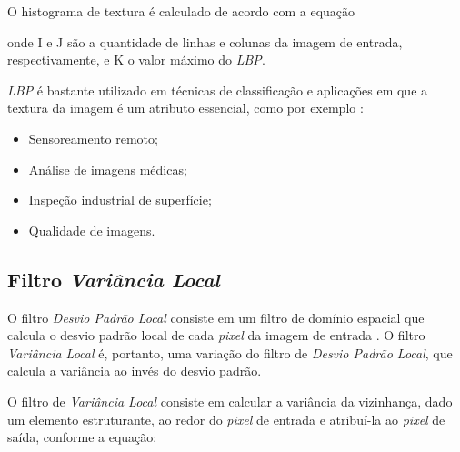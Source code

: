 \par O histograma de textura é calculado de acordo com a equação 

\noindent onde I e J são a quantidade de linhas e colunas da imagem de entrada, respectivamente, e K o valor máximo do \textit{\acrshort{LBP}}.

\par \textit{\acrshort{LBP}} é bastante utilizado em técnicas de classificação e aplicações em que a textura da imagem é um atributo essencial, como por exemplo \cite{ojala2002LBP}:

\begin{itemize}
    \item Sensoreamento remoto;
    \item Análise de imagens médicas;
    \item Inspeção industrial de superfície;
    \item Qualidade de imagens.
\end{itemize}


\subsection{Filtro \textit{Variância Local}}\label{sec:dom_esp:filtro_std}

\par O filtro \textit{Desvio Padrão Local} consiste em um filtro de domínio espacial que calcula o desvio padrão local de cada \textit{pixel} da imagem de entrada \cite{stdfilt}. O filtro \textit{Variância Local} é, portanto, uma variação do filtro de \textit{Desvio Padrão Local}, que calcula a variância ao invés do desvio padrão.


\par O filtro de \textit{Variância Local} consiste em calcular a variância da vizinhança, dado um elemento estruturante, ao redor do \textit{pixel} de entrada e atribuí-la ao \textit{pixel} de saída, conforme a equação:


